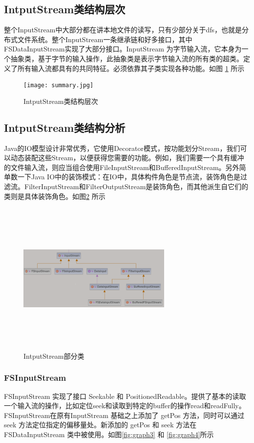 	\subsection{IntputStream类结构层次} 
	整个InputStream中大部分都在讲本地文件的读写，只有少部分关于dfs，也就是分布式文件系统。整个InputStream一条继承链和好多接口，其中FSDataInputStream实现了大部分接口。InputStream 为字节输入流，它本身为一个抽象类，基于字节的输入操作，此抽象类是表示字节输入流的所有类的超类。定义了所有输入流都具有的共同特征。必须依靠其子类实现各种功能。如图 \ref{fig:graph1} 所示
	
	\begin{figure}[H]
		\centering
		\texttt{[image: summary.jpg]}
		\caption{IntputStream类结构层次}
		\label{fig:graph1}
	\end{figure}
	
	\subsection{IntputStream类结构分析} 
	Java的IO模型设计非常优秀，它使用Decorator模式，按功能划分Stream，我们可以动态装配这些Stream，以便获得您需要的功能。例如，我们需要一个具有缓冲的文件输入流，则应当组合使用FileInputStream和BufferedInputStream。另外简单数一下Java IO中的装饰模式：在IO中，具体构件角色是节点流，装饰角色是过滤流。FilterInputStream和FilterOutputStream是装饰角色，而其他派生自它们的类则是具体装饰角色。如图\ref{fig:graph2} 所示
	
	\begin{figure}[H]
		\centerings
		\includegraphics[width=3in,height=3in]{common-io-diagram.png}
		\caption{IntputStream部分类}
		\label{fig:graph2}
	\end{figure}
	
	\subsubsection{FSInputStream}
	FSInputStream 实现了接口 Seekable 和 PositionedReadable。提供了基本的读取一个输入流的操作，比如定位seek和读取到特定的buffer的操作read和readFully。FSInputStream在原有InputStream 基础之上添加了 getPos 方法，同时可以通过 seek 方法定位指定的偏移量处。新添加的 getPos 和 seek 方法在 FSDataInputStream 类中被使用。如图\ref{fig:graph3} 和 \ref{fig:graph4}所示
	
